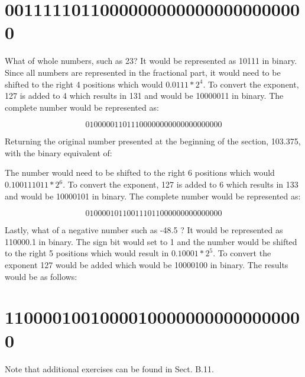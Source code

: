 \documentclass[10pt]{book}
\begin{document}
\section*{00111110110000000000000000000000}
What of whole numbers, such as 23? It would be represented as 10111 in binary. Since all numbers are represented in the fractional part, it would need to be shifted to the right 4 positions which would $0.0111 * 2^{4}$. To convert the exponent, 127 is added to 4 which results in 131 and would be 10000011 in binary. The complete number would be represented as:

$$
010000011011100000000000000000000
$$

Returning the original number presented at the beginning of the section, 103.375, with the binary equivalent of:

The number would need to be shifted to the right 6 positions which would $0.100111011 * 2^{6}$. To convert the exponent, 127 is added to 6 which results in 133 and would be 10000101 in binary. The complete number would be represented as:

$$
010000101100111011000000000000000
$$

Lastly, what of a negative number such as -48.5 ? It would be represented as 110000.1 in binary. The sign bit would set to 1 and the number would be shifted to the right 5 positions which would result in $0.10001 * 2^{5}$. To convert the exponent 127 would be added which would be 10000100 in binary. The results would be as follows:

\section*{11000010010000100000000000000000}
Note that additional exercises can be found in Sect. B.11.
\end{document}
